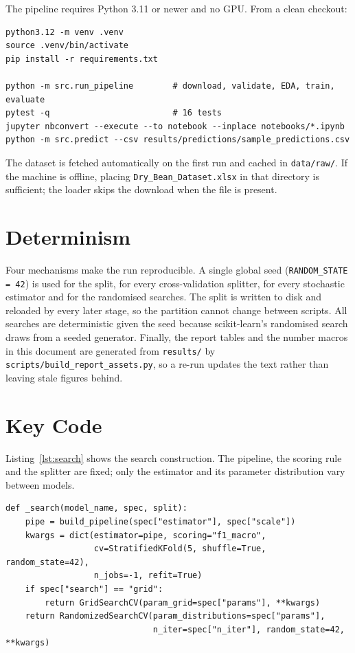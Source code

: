The pipeline requires Python 3.11 or newer and no GPU. From a clean checkout:

\begin{verbatim}
python3.12 -m venv .venv
source .venv/bin/activate
pip install -r requirements.txt

python -m src.run_pipeline        # download, validate, EDA, train, evaluate
pytest -q                         # 16 tests
jupyter nbconvert --execute --to notebook --inplace notebooks/*.ipynb
python -m src.predict --csv results/predictions/sample_predictions.csv
\end{verbatim}

The dataset is fetched automatically on the first run and cached in
\texttt{data/raw/}. If the machine is offline, placing
\texttt{Dry\_Bean\_Dataset.xlsx} in that directory is sufficient; the loader
skips the download when the file is present.

\section{Determinism}

Four mechanisms make the run reproducible. A single global seed
(\texttt{RANDOM\_STATE = 42}) is used for the split, for every cross-validation
splitter, for every stochastic estimator and for the randomised searches. The
split is written to disk and reloaded by every later stage, so the partition
cannot change between scripts. All searches are deterministic given the seed
because scikit-learn's randomised search draws from a seeded generator. Finally,
the report tables and the number macros in this document are generated from
\texttt{results/} by \texttt{scripts/build\_report\_assets.py}, so a re-run
updates the text rather than leaving stale figures behind.

\section{Key Code}

Listing~\ref{lst:search} shows the search construction. The pipeline, the
scoring rule and the splitter are fixed; only the estimator and its parameter
distribution vary between models.

\begin{lstlisting}[style=pycode, caption={Cross-validated search with the shared
protocol.}, label={lst:search}]
def _search(model_name, spec, split):
    pipe = build_pipeline(spec["estimator"], spec["scale"])
    kwargs = dict(estimator=pipe, scoring="f1_macro",
                  cv=StratifiedKFold(5, shuffle=True, random_state=42),
                  n_jobs=-1, refit=True)
    if spec["search"] == "grid":
        return GridSearchCV(param_grid=spec["params"], **kwargs)
    return RandomizedSearchCV(param_distributions=spec["params"],
                              n_iter=spec["n_iter"], random_state=42, **kwargs)
\end{lstlisting}

